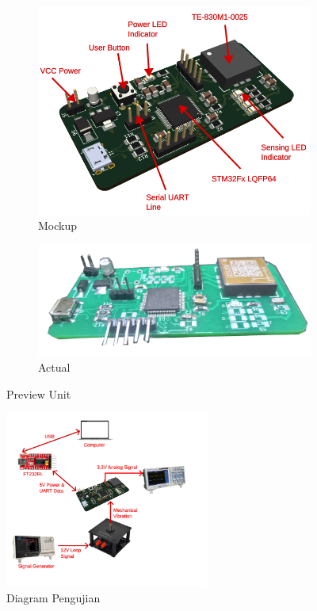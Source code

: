 \documentclass{book} %
\begin{document}
	\begin{figure}[!ht]
		\centering
		\begin{subfigure}{0.3\textwidth}
			\includegraphics[width=\textwidth]{images/vibparts.png}
			\caption{Mockup}
		\end{subfigure}
		\begin{subfigure}{0.3\textwidth}
			\includegraphics[width=\textwidth]{images/vibs.png}
			\caption{Actual}
		\end{subfigure}
		\caption{Preview Unit}
	\end{figure}
	
	\begin{figure}[!ht]
		\centering
		\includegraphics[width=0.6\textwidth]{images/testing}
		\caption{Diagram Pengujian}
	\end{figure}
	
\end{document}
